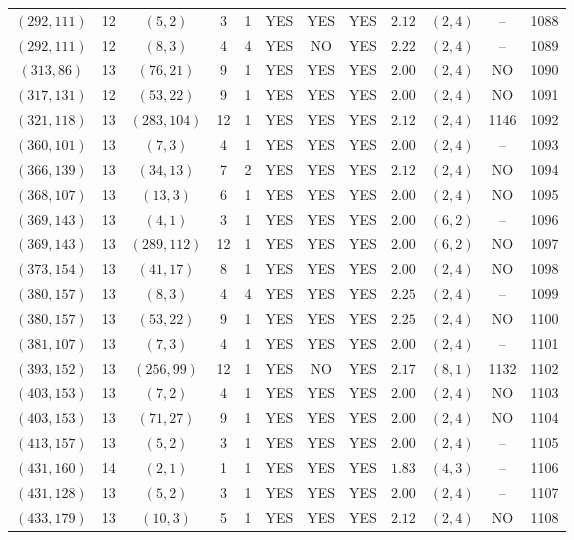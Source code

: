 \begin{longtable}{|c|c|c|c|c|c|c|c|c|c|c|c|}
$(292,111)$ & 12 & $(5,2)$ & 3 & 1 & YES & YES & YES & $2.12$ & $(2,4)$ & -- & 1088\\
$(292,111)$ & 12 & $(8,3)$ & 4 & 4 & YES & NO & YES & $2.22$ & $(2,4)$ & -- & 1089\\
$(313,86)$ & 13 & $(76,21)$ & 9 & 1 & YES & YES & YES & $2.00$ & $(2,4)$ & NO & 1090\\
$(317,131)$ & 12 & $(53,22)$ & 9 & 1 & YES & YES & YES & $2.00$ & $(2,4)$ & NO & 1091\\
$(321,118)$ & 13 & $(283,104)$ & 12 & 1 & YES & YES & YES & $2.12$ & $(2,4)$ & 1146 & 1092\\
$(360,101)$ & 13 & $(7,3)$ & 4 & 1 & YES & YES & YES & $2.00$ & $(2,4)$ & -- & 1093\\
$(366,139)$ & 13 & $(34,13)$ & 7 & 2 & YES & YES & YES & $2.12$ & $(2,4)$ & NO & 1094\\
$(368,107)$ & 13 & $(13,3)$ & 6 & 1 & YES & YES & YES & $2.00$ & $(2,4)$ & NO & 1095\\
$(369,143)$ & 13 & $(4,1)$ & 3 & 1 & YES & YES & YES & $2.00$ & $(6,2)$ & -- & 1096\\
$(369,143)$ & 13 & $(289,112)$ & 12 & 1 & YES & YES & YES & $2.00$ & $(6,2)$ & NO & 1097\\
$(373,154)$ & 13 & $(41,17)$ & 8 & 1 & YES & YES & YES & $2.00$ & $(2,4)$ & NO & 1098\\
$(380,157)$ & 13 & $(8,3)$ & 4 & 4 & YES & YES & YES & $2.25$ & $(2,4)$ & -- & 1099\\
$(380,157)$ & 13 & $(53,22)$ & 9 & 1 & YES & YES & YES & $2.25$ & $(2,4)$ & NO & 1100\\
$(381,107)$ & 13 & $(7,3)$ & 4 & 1 & YES & YES & YES & $2.00$ & $(2,4)$ & -- & 1101\\
$(393,152)$ & 13 & $(256,99)$ & 12 & 1 & YES & NO & YES & $2.17$ & $(8,1)$ & 1132 & 1102\\
$(403,153)$ & 13 & $(7,2)$ & 4 & 1 & YES & YES & YES & $2.00$ & $(2,4)$ & NO & 1103\\
$(403,153)$ & 13 & $(71,27)$ & 9 & 1 & YES & YES & YES & $2.00$ & $(2,4)$ & NO & 1104\\
$(413,157)$ & 13 & $(5,2)$ & 3 & 1 & YES & YES & YES & $2.00$ & $(2,4)$ & -- & 1105\\
$(431,160)$ & 14 & $(2,1)$ & 1 & 1 & YES & YES & YES & $1.83$ & $(4,3)$ & -- & 1106\\
$(431,128)$ & 13 & $(5,2)$ & 3 & 1 & YES & YES & YES & $2.00$ & $(2,4)$ & -- & 1107\\
$(433,179)$ & 13 & $(10,3)$ & 5 & 1 & YES & YES & YES & $2.12$ & $(2,4)$ & NO & 1108\\

\end{longtable}
